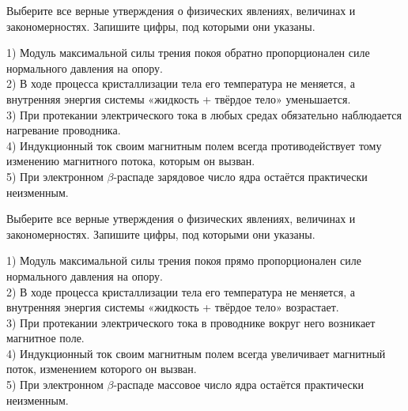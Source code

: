 \begin{taskbasic}[code={\label{task:kim18_v03}}]
Выберите все верные утверждения о физических явлениях, величинах и закономерностях. Запишите цифры, под которыми они указаны.

1) Модуль максимальной силы трения покоя обратно пропорционален силе нормального давления на опору.\\
2) В ходе процесса кристаллизации тела его температура не меняется, а внутренняя энергия системы «жидкость + твёрдое тело» уменьшается.\\
3) При протекании электрического тока в любых средах обязательно наблюдается нагревание проводника.\\
4) Индукционный ток своим магнитным полем всегда противодействует тому изменению магнитного потока, которым он вызван.\\
5) При электронном $\beta$-распаде зарядовое число ядра остаётся практически неизменным.

\end{taskbasic}

\begin{taskbasic}[code={\label{task:kim18_v04}}]
Выберите все верные утверждения о физических явлениях, величинах и закономерностях. Запишите цифры, под которыми они указаны.

1) Модуль максимальной силы трения покоя прямо пропорционален силе нормального давления на опору.\\
2) В ходе процесса кристаллизации тела его температура не меняется, а внутренняя энергия системы «жидкость + твёрдое тело» возрастает.\\
3) При протекании электрического тока в проводнике вокруг него возникает магнитное поле.\\
4) Индукционный ток своим магнитным полем всегда увеличивает магнитный поток, изменением которого он вызван.\\
5) При электронном $\beta$-распаде массовое число ядра остаётся практически неизменным.

\end{taskbasic}

